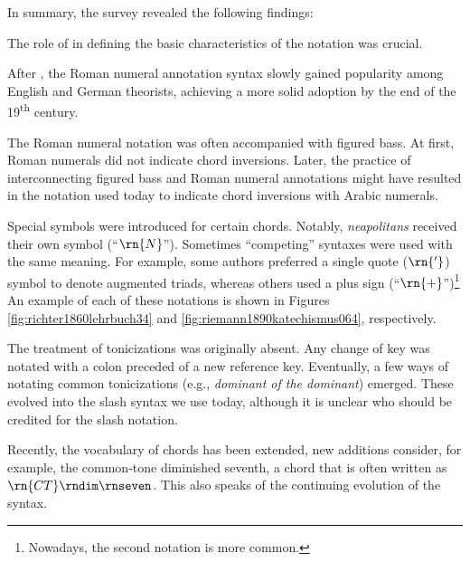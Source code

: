 In summary, the survey revealed the following findings:

The role of \textcite{weber1817versuch} in defining the
basic characteristics of the notation was crucial.


After \textcite{weber1817versuch}, the Roman numeral
annotation syntax slowly gained popularity among English and
German theorists, achieving a more solid adoption by the end
of the 19\textsuperscript{th} century.

 The Roman numeral notation was often accompanied with
figured bass. At first, Roman numerals did not indicate
chord inversions. Later, the practice of interconnecting
figured bass and Roman numeral annotations might have
resulted in the notation used today to indicate chord
inversions with Arabic numerals.

Special symbols were introduced for certain chords. Notably,
\emph{neapolitans} received their own symbol (``$\rn{N}$'').
Sometimes ``competing'' syntaxes were used with the same
meaning. For example, some authors preferred a single quote
($\rn{'}$) symbol to denote augmented triads, whereas others
used a plus sign (``$\rn{+}$'')\footnote{Nowadays, the
second notation is more common.} An example of each of these
notations is shown in Figures
\ref{fig:richter1860lehrbuch34} and
\ref{fig:riemann1890katechismus064}, respectively.

The treatment of tonicizations was originally absent. Any
change of key was notated with a colon preceded of a new
reference key. Eventually, a few ways of notating common
tonicizations (e.g., \emph{dominant of the dominant})
emerged. These evolved into the slash syntax we use today,
although it is unclear who should be credited for the slash
notation.

Recently, the vocabulary of chords has been extended, new
additions consider, for example, the common-tone diminished
seventh, a chord that is often written as
$\rn{CT}\rndim\rnseven$. This also speaks of the continuing
evolution of the syntax.

